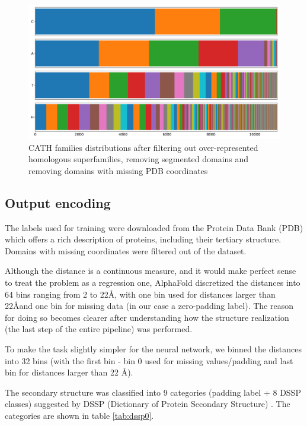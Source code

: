 \begin{figure}
    \centering
    \includegraphics[width=\linewidth]{imgs_tomas/cath_distributions_filtered.png}
    \caption{CATH families distributions after filtering out over-represented homologous superfamilies, removing segmented domains and removing domains with missing PDB coordinates}
    \label{fig:cath_filtered}
\end{figure}

\subsection{Output encoding}

The labels used for training were downloaded from the Protein Data Bank (PDB) which offers a rich description of proteins, including their tertiary structure. 
Domains with missing coordinates were filtered out of the dataset.
        
Although the distance is a continuous measure, and it would make perfect sense to treat the problem as a regression one, AlphaFold discretized the distances into 64 bins ranging from 2 to 22\AA, with one bin used for distances larger than 22\AA and one bin for missing data (in our case a zero-padding label). 
The reason for doing so becomes clearer after understanding how the structure realization (the last step of the entire pipeline) was performed.

To make the task slightly simpler for the neural network, we binned the distances into 32 bins (with the first bin - bin 0 used for missing values/padding and last bin for distances larger than 22 \AA).
        
The secondary structure was classified into 9 categories (padding label + 8 DSSP classes) suggested by DSSP (Dictionary of Protein Secondary Structure) \cite{dssp1, dssp2, dssp3}.
The categories are shown in table \ref{tab:dssp0}.

